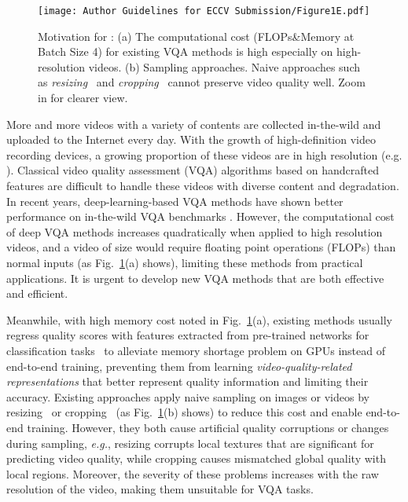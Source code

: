 \documentclass[runningheads]{llncs}
\begin{document}
\begin{figure}[]
    \centering
    \texttt{[image: Author Guidelines for ECCV Submission/Figure1E.pdf]}
    \vspace{-5pt}
    \caption{Motivation for \frag: (a) The computational cost (FLOPs\&Memory at Batch Size 4) for existing VQA methods is high especially on high-resolution videos. (b) Sampling approaches. Naive approaches such as \textit{resizing}~\cite{musiq,dbcnn} and \textit{cropping}~\cite{crop1,crop2} cannot preserve video quality well. Zoom in for clearer view.}
    \label{fig:1}
    \vspace{-19pt}
\end{figure}










More and more videos with a variety of contents are collected in-the-wild and uploaded to the Internet every day. With the growth of high-definition video recording devices, a growing proportion of these videos are in high resolution (e.g. ). Classical video quality assessment (VQA) algorithms based on handcrafted features are difficult to handle these videos with diverse content and degradation. In recent years, deep-learning-based VQA methods \cite{vsfa,mdtvsfa,pvq,mlsp,cnn+lstm,cnntlvqm} have shown better performance on in-the-wild VQA benchmarks \cite{vqc,kv1k,ytugc,pvq}. However, the computational cost of deep VQA methods increases quadratically when applied to high resolution videos, and a video of size  would require  floating point operations (FLOPs) than normal  inputs (as Fig.~\ref{fig:1}(a) shows), limiting these methods from practical applications. It is urgent to develop new VQA methods that are both effective and efficient.

Meanwhile, with high memory cost noted in Fig.~\ref{fig:1}(a), existing methods usually regress quality scores with  features extracted from pre-trained networks for classification tasks~\cite{he2016residual,irnv2,r3d} to alleviate memory shortage problem on GPUs instead of end-to-end training, preventing them from learning \textit{video-quality-related representations} that better represent quality information and limiting their accuracy. Existing approaches apply naive sampling on images or videos by resizing~\cite{musiq,dbcnn} or cropping~\cite{crop1,crop2} (as Fig.~\ref{fig:1}(b) shows) to reduce this cost and enable end-to-end training. However, they both cause artificial quality corruptions or changes during sampling, \emph{e.g.}, resizing corrupts local textures that are significant for predicting video quality, while cropping causes mismatched global quality with local regions. Moreover, the severity of these problems increases with the raw resolution of the video, making them unsuitable for VQA tasks.
\end{document}

